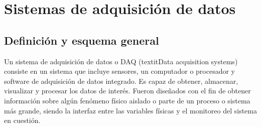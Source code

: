 \begin{table}[H]
    \centering
    \caption{Ventajas y desventajas de los enfoques de monitoreo.}
    \label{tab:monitoreo}
\end{table}


\section{Sistemas de adquisición de datos}

\subsection{Definición y esquema general} Un sistema de adquisición de datos o DAQ (textit{Data acquisition systems})  consiste en un sistema que incluye sensores, un computador o procesador y software de adquisición de datos integrado. Es capaz de obtener, almacenar, visualizar y procesar los datos de interés. Fueron diseñados con el fin de obtener información sobre algún fenómeno físico aislado o parte de un proceso o sistema más grande, siendo la interfaz entre las variables físicas y el monitoreo del sistema en cuestión.

